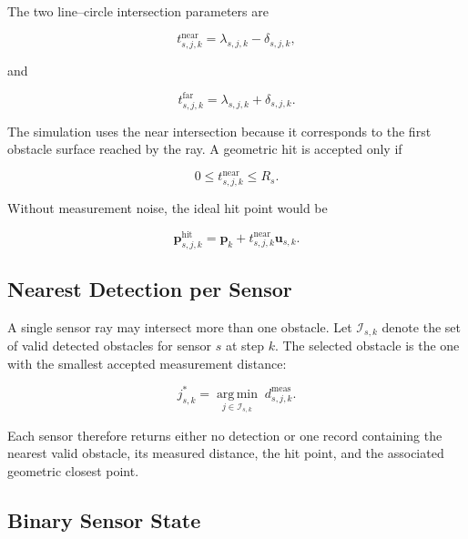 \documentclass[10pt,twocolumn,a4paper]{article}
\begin{document}
The two line--circle intersection parameters are

\begin{equation}
    t^{\mathrm{near}}_{s,j,k}
    =
    \lambda_{s,j,k}-\delta_{s,j,k},
    \label{eq:near_intersection}
\end{equation}

and

\begin{equation}
    t^{\mathrm{far}}_{s,j,k}
    =
    \lambda_{s,j,k}+\delta_{s,j,k}.
    \label{eq:far_intersection}
\end{equation}

The simulation uses the near intersection because it corresponds to the
first obstacle surface reached by the ray. A geometric hit is accepted
only if

\begin{equation}
    0\leq t^{\mathrm{near}}_{s,j,k}\leq R_s.
    \label{eq:finite_ray_condition}
\end{equation}

Without measurement noise, the ideal hit point would be

\begin{equation}
    \mathbf{p}^{\mathrm{hit}}_{s,j,k}
    =
    \mathbf{p}_k
    +t^{\mathrm{near}}_{s,j,k}\mathbf{u}_{s,k}.
    \label{eq:ideal_hit_point}
\end{equation}

\subsection{Nearest Detection per Sensor}

A single sensor ray may intersect more than one obstacle. Let
$\mathcal{I}_{s,k}$ denote the set of valid detected obstacles for sensor
$s$ at step $k$. The selected obstacle is the one with the smallest
accepted measurement distance:

\begin{equation}
    j_{s,k}^{*}
    =
    \underset{j\in\mathcal{I}_{s,k}}{\operatorname{arg\,min}}
    \;d^{\mathrm{meas}}_{s,j,k}.
    \label{eq:nearest_detection}
\end{equation}

Each sensor therefore returns either no detection or one record
containing the nearest valid obstacle, its measured distance, the hit
point, and the associated geometric closest point.

\subsection{Binary Sensor State}
\end{document}
